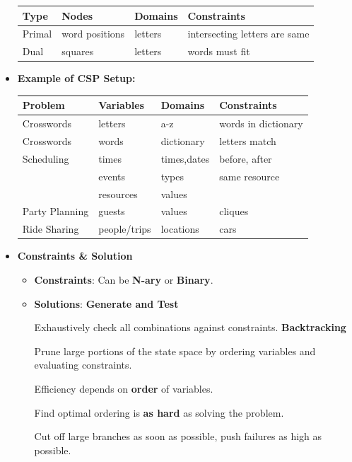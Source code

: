 \documentclass{article}
\theoremstyle{note}
\begin{document}
\begin{itemize}
	\begin{tabular}{@{}llll@{}}
	\toprule
 	\textbf{Type} & \textbf{Nodes} & \textbf{Domains} & \textbf{Constraints} \\ \midrule
	Primal & word positions & letters & intersecting letters are same \\ \midrule
	Dual & squares & letters & words must fit \\
	\bottomrule
	\end{tabular}

  \item \textbf{Example of CSP Setup:}
   
   \begin{tabular}{@{}llll@{}}
   \toprule
   \textbf{Problem} & \textbf{Variables} & \textbf{Domains} & \textbf{Constraints} \\ \midrule
   Crosswords & letters & a-z & words in dictionary \\ \midrule
   Crosswords & words & dictionary & letters match \\ \midrule
   Scheduling & times & times,dates & before, after \\
 & events & types & same resource \\
 & resources & values & \\ \midrule
Party Planning & guests & values & cliques \\ \midrule
Ride Sharing & people/trips & locations & cars \\
\bottomrule
\end{tabular}

  \item \textbf{Constraints \& Solution}
  \begin{itemize}
    \item \textbf{Constraints}: Can be \textbf{N-ary} or \textbf{Binary}.
    \item \textbf{Solutions}:
    \subitem \textbf{Generate and Test} 
    
    Exhaustively check all combinations against constraints.
    \subitem \textbf{Backtracking} 
    
    Prune large portions of the state space by ordering variables and evaluating constraints.
    
    Efficiency depends on \textbf{order} of variables.
    
    Find optimal ordering is \textbf{as hard} as solving the problem.
    
    Cut off large branches as soon as possible, push failures as high as possible.
    

\end{itemize}
\end{itemize}
\end{document}
